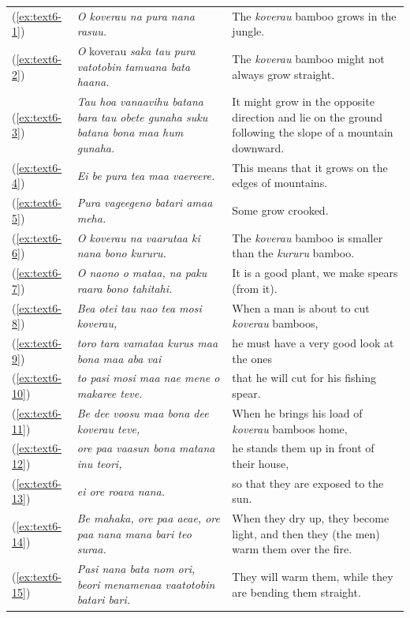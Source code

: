 \documentclass[output=paper]{langscibook}
\begin{document}
\begin{xltabular}{\textwidth}{lXX}
    (\ref{ex:text6-1})&\textit{O koverau na pura nana rasuu.}&The \textit{koverau} bamboo grows in the jungle.\\
    (\ref{ex:text6-2})&\textit{O }koverau\textit{ saka tau pura vatotobin tamuana bata haana.}&The \textit{koverau} bamboo might not always grow straight.\\
    (\ref{ex:text6-3})&\textit{Tau hoa vanaavihu batana bara tau obete gunaha suku batana bona maa hum gunaha.}&It might grow in the opposite direction and lie on the ground following the slope of a mountain downward.\\
    (\ref{ex:text6-4})&\textit{Ei be pura tea maa vaereere.}&This means that it grows on the edges of mountains.\\
    (\ref{ex:text6-5})&\textit{Pura vageegeno batari amaa meha.}&Some grow crooked.\\
    (\ref{ex:text6-6})&\textit{O koverau na vaarutaa ki nana bono kururu.}&The \textit{koverau} bamboo is smaller than the \textit{kururu} bamboo.\\
    (\ref{ex:text6-7})&\textit{O naono o mataa, na paku raara bono tahitahi.}&It is a good plant, we make spears (from it).\\
    (\ref{ex:text6-8})&\textit{Bea otei tau nao tea mosi koverau,}&When a man is about to cut \textit{koverau} bamboos,\\
    (\ref{ex:text6-9})&\textit{toro tara vamataa kurus maa bona maa aba vai}&he must have a very good look at the ones\\
    (\ref{ex:text6-10})&\textit{to pasi mosi maa nae mene o makaree teve.}&that he will cut for his fishing spear.\\
    (\ref{ex:text6-11})&\textit{Be dee voosu maa bona dee koverau teve,}&When he brings his load of \textit{koverau} bamboos home,\\
    (\ref{ex:text6-12})&\textit{ore paa vaasun bona matana inu teori,}&he stands them up in front of their house,\\
    (\ref{ex:text6-13})&\textit{ei ore roava nana.}&so that they are exposed to the sun.\\
    (\ref{ex:text6-14})&\textit{Be mahaka, ore paa aeae, ore paa nana mana bari teo suraa.}&When they dry up, they become light, and then they (the men) warm them over the fire.\\
    (\ref{ex:text6-15})&\textit{Pasi nana bata nom ori, beori menamenaa vaatotobin batari bari.}&They will warm them, while they are bending them straight.\\

\end{xltabular}
\end{document}
